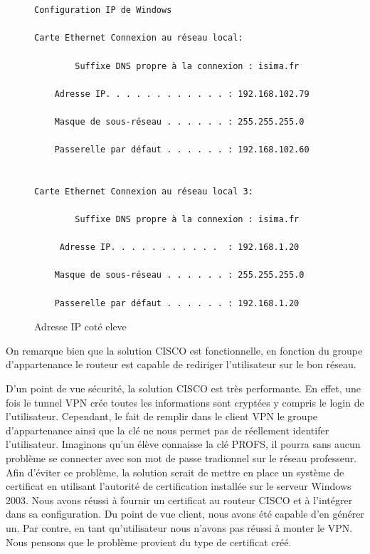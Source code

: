 \begin{figure}[H]
	\begin{center}
		\begin{minipage}{1\textwidth}
			\begin{lstlisting}[frame=trBL]


Configuration IP de Windows

Carte Ethernet Connexion au réseau local:

        Suffixe DNS propre à la connexion : isima.fr
        
	Adresse IP. . . . . . . . . . . . : 192.168.102.79
        
	Masque de sous-réseau . . . . . . : 255.255.255.0
        
	Passerelle par défaut . . . . . . : 192.168.102.60


Carte Ethernet Connexion au réseau local 3:

        Suffixe DNS propre à la connexion : isima.fr
       
	 Adresse IP. . . . . . . . . . .  : 192.168.1.20
        
	Masque de sous-réseau . . . . . . : 255.255.255.0
        
	Passerelle par défaut . . . . . . : 192.168.1.20

\end{lstlisting}
		\end{minipage}
	\end{center}
	\caption{Adresse IP coté eleve}
	\label{Adresse_IP_cote_eleve}
\end{figure}

On remarque bien que la solution CISCO est fonctionnelle, en fonction du groupe d'appartenance le routeur est capable de rediriger l'utilisateur sur le bon réseau.

D'un point de vue sécurité, la solution CISCO est très performante. En effet, une fois le tunnel VPN crée toutes les informations sont cryptées y compris le login de l'utilisateur. Cependant, le fait de remplir dans le client VPN le groupe d'appartenance ainsi que la clé ne nous permet pas de réellement identifer l'utilisateur. Imaginons qu'un élève connaisse la clé PROFS, il pourra sans aucun problème se connecter avec son mot de passe tradionnel sur le réseau professeur. Afin d'éviter ce problème, la solution serait de mettre en place un système de certificat en utilisant l'autorité de certification installée sur le serveur Windows 2003. Nous avons réussi à fournir un certificat au routeur CISCO et à l'intégrer dans sa configuration. Du point de vue client, nous avons été capable d'en générer un. Par contre, en tant qu'utilisateur nous n'avons pas réussi à monter le VPN. Nous pensons que le problème provient du type de certificat créé.